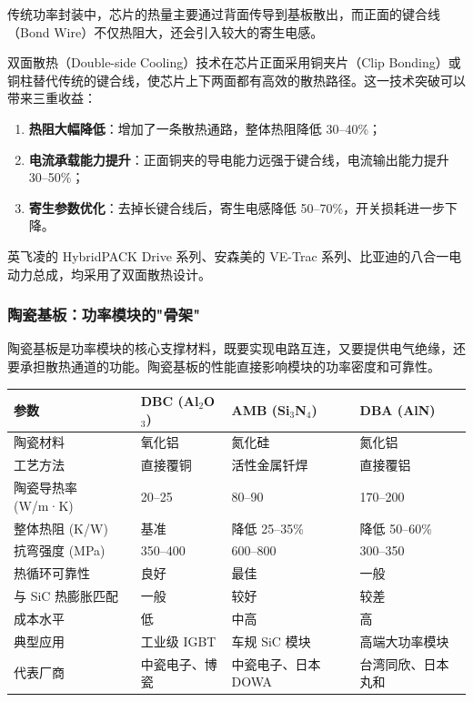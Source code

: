 传统功率封装中，芯片的热量主要通过背面传导到基板散出，而正面的键合线（Bond Wire）不仅热阻大，还会引入较大的寄生电感。

双面散热（Double-side Cooling）技术在芯片正面采用铜夹片（Clip Bonding）或铜柱替代传统的键合线，使芯片上下两面都有高效的散热路径。这一技术突破可以带来三重收益：

\begin{enumerate}[leftmargin=2em]
\item \textbf{热阻大幅降低}：增加了一条散热通路，整体热阻降低 30–40\%；
\item \textbf{电流承载能力提升}：正面铜夹的导电能力远强于键合线，电流输出能力提升 30–50\%；
\item \textbf{寄生参数优化}：去掉长键合线后，寄生电感降低 50–70\%，开关损耗进一步下降。
\end{enumerate}

英飞凌的 HybridPACK Drive 系列、安森美的 VE-Trac 系列、比亚迪的八合一电动力总成，均采用了双面散热设计。

\subsubsection{陶瓷基板：功率模块的"骨架"}

陶瓷基板是功率模块的核心支撑材料，既要实现电路互连，又要提供电气绝缘，还要承担散热通道的功能。陶瓷基板的性能直接影响模块的功率密度和可靠性。

\begin{exhibitbox}[表 4-7：三种陶瓷基板技术对比]
\centering
\small
\setlength{\tabcolsep}{4pt}
\begin{tabularx}{\textwidth}{L{2.5cm} C{2.8cm} C{2.8cm} C{2.8cm}}
\toprule
\textbf{参数} & \textbf{DBC (Al$_2$O$_3$)} & \textbf{AMB (Si$_3$N$_4$)} & \textbf{DBA (AlN)} \\
\midrule
陶瓷材料 & 氧化铝 & 氮化硅 & 氮化铝 \\
工艺方法 & 直接覆铜 & 活性金属钎焊 & 直接覆铝 \\
陶瓷导热率 (W/m·K) & 20–25 & 80–90 & 170–200 \\
整体热阻 (K/W) & 基准 & 降低 25–35\% & 降低 50–60\% \\
\midrule
抗弯强度 (MPa) & 350–400 & 600–800 & 300–350 \\
热循环可靠性 & 良好 & 最佳 & 一般 \\
与 SiC 热膨胀匹配 & 一般 & 较好 & 较差 \\
\midrule
成本水平 & 低 & 中高 & 高 \\
典型应用 & 工业级 IGBT & 车规 SiC 模块 & 高端大功率模块 \\
代表厂商 & 中瓷电子、博瓷 & 中瓷电子、日本 DOWA & 台湾同欣、日本丸和 \\
\bottomrule
\end{tabularx}
\end{exhibitbox}

